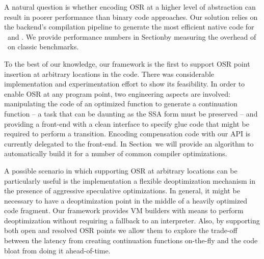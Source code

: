 \noindent A natural question is whether encoding OSR at a higher level of abstraction can result in poorer performance than binary code approaches. Our solution relies on the backend's compilation pipeline to generate the most efficient native code for \fosrfrom\ and \fosrto. We provide performance numbers in Section\missing by measuring the overhead of \osrkit\ on classic benchmarks.

To the best of our knowledge, our framework is the first to support OSR point insertion at arbitrary locations in the code. There was considerable implementation and experimentation effort to show its feasibility. In order to enable OSR at any program point, two engineering aspects are involved: manipulating the code of an optimized function to generate a continuation function -- a task that can be daunting as the SSA form must be preserved -- and providing a front-end with a clean interface to specify glue code that might be required to perform a transition. Encoding compensation code with our API is currently delegated to the front-end. In Section\missing\ we will provide an algorithm to automatically build it for a number of common compiler optimizations.

A possible scenario in which supporting OSR at arbitrary locations can be particularly useful is the implementation a flexible deoptimization mechanism in the presence of aggressive speculative optimizations. In general, it might be necessary to have a deoptimization point in the middle of a heavily optimized code fragment. Our framework provides VM builders with means to perform deoptimization without requiring a fallback to an interpreter. Also, by supporting both open and resolved OSR points we allow them to explore the trade-off between the latency from creating continuation functions on-the-fly and the code bloat from doing it ahead-of-time.




